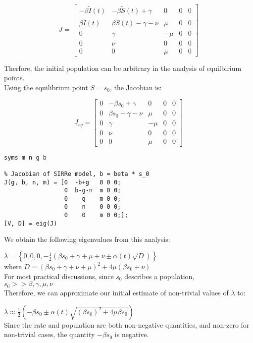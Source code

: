 \documentclass{article}
\begin{document}
$$
J = \begin{bmatrix}
    -\beta \tilde{I}(t) & -\beta \tilde{S}(t) + \gamma & 0 & 0 & 0 \\
    \beta \tilde{I}(t) & \beta \tilde{S}(t) -\gamma - \nu & \mu & 0 & 0 \\
    0 & \gamma & -\mu & 0 & 0 \\
    0 & \nu & 0 & 0 & 0 \\
    0 & 0 & \mu & 0 & 0 
\end{bmatrix}
$$

Therfore, the initial population can be arbitrary in the analysis of equilbirium points. \\
Using the equilibrium point $S = s_0$, the Jacobian is:

$$J_{eq} = \begin{bmatrix}
    0 & -\beta s_0 + \gamma & 0 & 0 & 0 \\
    0 & \beta s_0 -\gamma - \nu & \mu & 0 & 0 \\
    0 & \gamma & -\mu & 0 & 0 \\
    0 & \nu & 0 & 0 & 0 \\
    0 & 0 & \mu & 0 & 0 
\end{bmatrix}$$

\begin{verbatim}
syms m n g b

% Jacobian of SIRRe model, b = beta * s_0
J(g, b, n, m) = [0  -b+g   0 0 0;
                 0  b-g-n  m 0 0;
                 0    g   -m 0 0;
                 0    n    0 0 0;
                 0    0    m 0 0;];
[V, D] = eig(J)

\end{verbatim}
We obtain the following eigenvalues from this analysis:

$\lambda = \left\{ 0, 0, 0, -\frac{1}{2} \left( \beta s_0 + \gamma + \mu + \nu \pm \alpha(t)\sqrt{D} \right) \right\} $ \\
where $D = \left( \beta s_0 + \gamma + \nu + \mu \right)^2 + 4\mu(\beta s_0 + \nu) $ \\
For most practical discussions, since $s_0$ describes a population, \\
$s_0 >> \beta, \gamma, \mu, \nu$ \\
Therefore, we can approximate our initial estimate of non-trivial values of $\lambda$ to:

$\lambda \approx \frac{1}{2} \left(-\beta s_0 \pm \alpha(t)\sqrt{\left( \beta s_0 \right)^2 + 4\mu \beta s_0} \right)$ \\
Since the rate and population are both non-negative quantities, and non-zero for non-trivial cases,
the quantity $-\beta s_0$ is negative.
\end{document}
